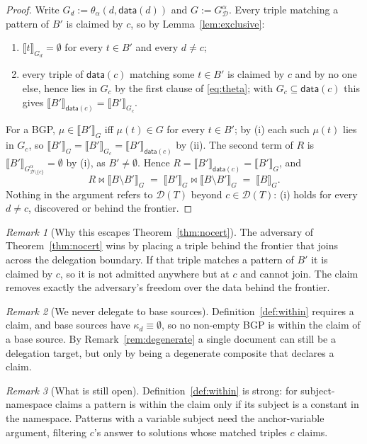 \documentclass[11pt,a4paper]{article}
\theoremstyle{definition}
\theoremstyle{plain}
\theoremstyle{remark}
\newtheorem*{remark}{Remark}
\newcommand{\Dd}{\mathcal{D}}
\newcommand{\dataf}{\mathsf{data}}
\newcommand{\ev}[2]{\llbracket #1 \rrbracket_{#2}}
\begin{document}
\begin{proof}
Write $G_d := \theta_\alpha(d, \dataf(d))$ and $G := G^{\alpha}_{\Dd}$. Every triple
matching a pattern of $B'$ is claimed by $c$, so by Lemma~\ref{lem:exclusive}:
\begin{enumerate}[label=(\roman*)]
  \item $\ev{t}{G_d} = \emptyset$ for every $t \in B'$ and every $d \neq c$;
  \item every triple of $\dataf(c)$ matching some $t \in B'$ is claimed by $c$ and by no
        one else, hence lies in $G_c$ by the first clause of \eqref{eq:theta}; with
        $G_c \subseteq \dataf(c)$ this gives $\ev{B'}{\dataf(c)} = \ev{B'}{G_c}$.
\end{enumerate}
For a BGP, $\mu \in \ev{B'}{G}$ iff $\mu(t) \in G$ for every $t \in B'$; by (i) each
such $\mu(t)$ lies in $G_c$, so $\ev{B'}{G} = \ev{B'}{G_c} = \ev{B'}{\dataf(c)}$ by (ii).
The second term of $R$ is $\ev{B'}{G^{\alpha}_{\Dd \setminus \{c\}}} = \emptyset$ by (i),
as $B' \neq \emptyset$. Hence $R = \ev{B'}{\dataf(c)} = \ev{B'}{G}$, and
\[
  R \bowtie \ev{B \setminus B'}{G} \;=\; \ev{B'}{G} \bowtie \ev{B \setminus B'}{G}
  \;=\; \ev{B}{G}.
\]
Nothing in the argument refers to $\Dd(T)$ beyond $c \in \Dd(T)$: (i) holds for every
$d \neq c$, discovered or behind the frontier.
\end{proof}

\begin{remark}[Why this escapes Theorem~\ref{thm:nocert}]
The adversary of Theorem~\ref{thm:nocert} wins by placing a triple behind the frontier
that joins across the delegation boundary. If that triple matches a pattern of $B'$ it
is claimed by $c$, so it is not admitted anywhere but at $c$ and cannot join. The
claim removes exactly the adversary's freedom over the data behind the frontier.
\end{remark}

\begin{remark}[We never delegate to base sources]
Definition~\ref{def:within} requires a claim, and base sources have
$\kappa_d \equiv \emptyset$, so no non-empty BGP is within the claim of a base source.
By Remark~\ref{rem:degenerate} a single document can still be a delegation target, but
only by being a degenerate composite that declares a claim.
\end{remark}

\begin{remark}[What is still open]
Definition~\ref{def:within} is strong: for subject-namespace claims a pattern is within
the claim only if its subject is a constant in the namespace. Patterns with a variable
subject need the anchor-variable argument, filtering $c$'s answer to solutions whose
matched triples $c$ claims.
\end{remark}
\end{document}
